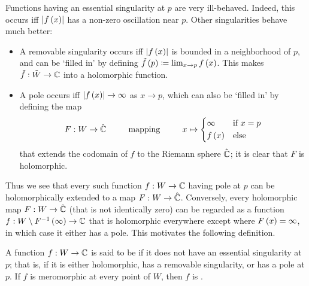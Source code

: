 \documentclass[../Moduli_Spaces_of_Riemann_Surfaces.tex]{subfiles}
\begin{document}
    \begin{remark}\label{1.2:rem:nice_singularities}
        Functions having an essential singularity at $p$ are very ill-behaved. Indeed, this occurs iff $\left|f\left(x\right)\right|$ has a non-zero oscillation near $p$. Other singularities behave much better:
        \begin{itemize}
            \item A removable singularity occurs iff $\left|f\left(x\right)\right|$ is bounded in a neighborhood of $p$, and can be $\textrm{`}$filled in$\textrm{'}$ by defining $\tilde{f}\left(p\right)\coloneqq\lim_{x\to p}f\left(x\right)$. This makes $\tilde{f}:\tilde{W}\to\mathbb{C}$ into a holomorphic function.
            \vspace{-0.08in}
            \item A pole occurs iff $\left|f\left(x\right)\right|\to\infty$ as $x\to p$, which can also be $\textrm{`}$filled in$\textrm{'}$ by defining the map
                \begin{equation*}
                    F:W\to\RS\ \ \ \ \ \ \ \ \textrm{mapping}\ \ \ \ \ \ \ \ x\mapsto
                    \begin{dcases}
                        \infty & \textrm{if }x=p \\
                        f\l(x\r) & \textrm{else}
                    \end{dcases}
                \end{equation*}
                that extends the codomain of $f$ to the Riemann sphere $\hat{\mathbb{C}}$; it is clear that $F$ is holomorphic.
        \end{itemize}
        Thus we see that every such function $f:W\to\mathbb{C}$ having pole at $p$ can be holomorphically extended to a map $F:W\to\hat{\mathbb{C}}$. Conversely, every holomorphic map $F:W\to\hat{\mathbb{C}}$ (that is not identically zero) can be regarded as a function $f:W\setminus F^{-1}\left(\infty\right)\to\mathbb{C}$ that is holomorphic everywhere except where $F\left(x\right)=\infty$, in which case it either has a pole. This motivates the following definition.\exqed
    \end{remark}
    \begin{definition}
        A function $f:W\to\mathbb{C}$ is said to be  if it does not have an essential singularity at $p$; that is, if it is either holomorphic, has a removable singularity, or has a pole at $p$. If $f$ is meromorphic at every point of $W$, then $f$ is .
    \end{definition}
\end{document}
